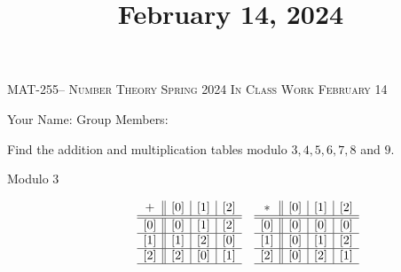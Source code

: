 \documentclass[handout]{ximera}
\title{February 14, 2024}
\begin{document}
\handoutAbstract
\maketitle
  \begin{center}%
    {\large \scshape MAT-255-- Number Theory \hfill Spring 2024 \hfill In Class Work February 14}%
    
    {\large
        Your Name: \hrulefill \quad Group Members:\hrulefill \quad \hrulefill
	\par}%
  \end{center}%


\begin{br}
    Find the addition and multiplication tables modulo $3,4,5,6,7,8$ and $9.$ 
    
    \begin{solution}
        \begin{description}
            \item[Modulo $3$] 
                \begin{align*}
                & \begin{array}{c||c|c|c}
                    + & [0] & [1] & [2]\\ \hline\hline
                    [0] & [0] & [1] & [2] \\ \hline
                    [1] & [1] & [2] & [0] \\ \hline
                    [2]  & [2] & [0]& [1]\\ \hline
                \end{array}
                & \begin{array}{c||c|c|c}
                    \ast & [0] & [1] & [2]\\ \hline\hline
                    [0] & [0] & [0] & [0] \\ \hline
                    [1] & [0] & [1] & [2] \\ \hline
                    [2] & [0] & [2]& [1]\\ \hline
                \end{array}
                \end{align*}
        

\end{description}
\end{solution}
\end{br}
\end{document}
